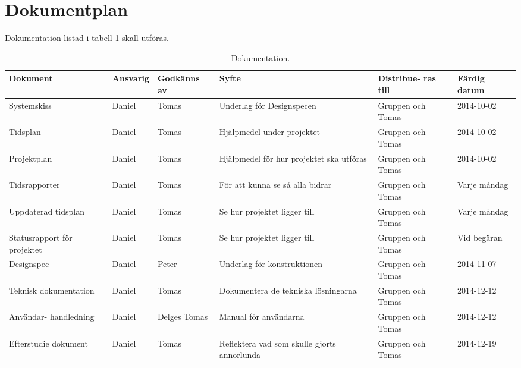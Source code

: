 \section{Dokumentplan}
Dokumentation listad i tabell \ref{dokumentation:tabell} skall utföras.

\begin{table}[h]
	\centering
		\begin{tabularx}{\textwidth}{| p{22mm} | l | X | p{25mm} | X | l |}
			\hline
			\textbf{Dokument} & \textbf{Ansvarig} & \textbf{Godkänns av} & \textbf{Syfte} & \textbf{Distribue-
  ras till} & \textbf{Färdig datum} \\\hline

			{Systemskiss} & {Daniel} & {Tomas} & {Underlag för Designspecen} & {Gruppen och Tomas} & {2014-10-02} \\\hline
    		{Tidsplan} & {Daniel} & {Tomas}& {Hjälpmedel under projektet} & {Gruppen och Tomas} & {2014-10-02} \\\hline
			{Projektplan} & {Daniel} & {Tomas} & {Hjälpmedel för hur projektet ska utföras} & {Gruppen och Tomas} & {2014-10-02} \\\hline
			{Tidsrapporter} & {Daniel} & {Tomas} & {För att kunna se så alla bidrar} & {Gruppen och Tomas} & {Varje måndag} \\\hline
			{Uppdaterad tidsplan} & {Daniel} & {Tomas} & {Se hur projektet ligger till} & {Gruppen och Tomas} & {Varje måndag} \\\hline
			{Statusrapport för projektet} & {Daniel} & {Tomas} & {Se hur projektet ligger till} & {Gruppen och Tomas} & {Vid begäran} \\\hline
			{Designspec} & {Daniel} & {Peter} & {Underlag för konstruktionen} & {Gruppen och Tomas} & {2014-11-07} \\\hline
            {Teknisk
			dokumentation} & {Daniel} & {Tomas} & {Dokumentera de tekniska lösningarna} & {Gruppen och Tomas} & {2014-12-12} \\\hline
            {Användar-
			handledning} & {Daniel} & {Delges Tomas} & {Manual för användarna} & {Gruppen och Tomas} & {2014-12-12} \\\hline
			{Efterstudie
			dokument} & {Daniel} & {Tomas}& {Reflektera vad som skulle gjorts annorlunda} & {Gruppen och Tomas} & {2014-12-19} \\\hline
		\end{tabularx}
	\caption{Dokumentation.} \label{dokumentation:tabell}
\end{table}
